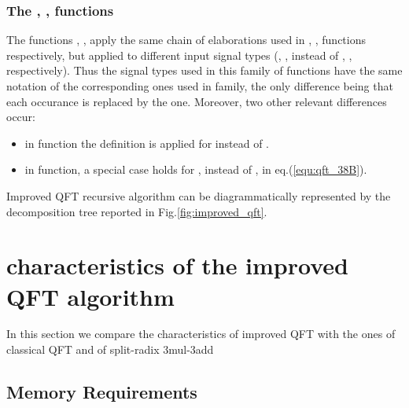 \documentclass[a4paper,10pt]{article}
\begin{document}
\subsubsection{The , ,  functions} \label{sec:new_qft_dst_functions}

The functions , ,  apply the same chain of elaborations used in , ,  functions respectively, but applied to different input signal types (, ,  instead of , ,  respectively).
Thus the signal types used in this  family of functions have the same notation of the
corresponding ones used in  family, the only difference being that each  occurance is
replaced by the  one. 
Moreover, two other relevant differences occur:
\begin{itemize}
\item 
in  function the  definition is applied for  instead of .

\item
in  function, a special case holds for , instead of  , in eq.(\ref{equ:qft_38B}).

\end{itemize}
Improved QFT recursive algorithm can be diagrammatically represented by the decomposition tree reported in Fig.\ref{fig:improved_qft}.







\section{characteristics of the improved QFT algorithm} \label{sec:results}


In this section we compare the characteristics of improved QFT with the ones of classical QFT and of split-radix 3mul-3add





\subsection{Memory Requirements} \label{sec:memory_new_qft}
\end{document}
